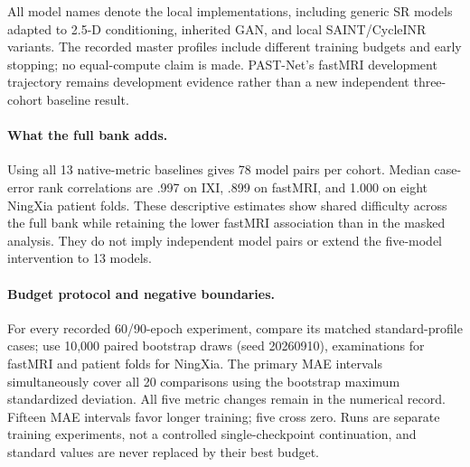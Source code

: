 All model names denote the local implementations, including generic SR models adapted to 2.5-D conditioning, inherited GAN, and local SAINT/CycleINR variants. The recorded master profiles include different training budgets and early stopping; no equal-compute claim is made. PAST-Net's fastMRI development trajectory remains development evidence rather than a new independent three-cohort baseline result.

\paragraph{What the full bank adds.}
Using all 13 native-metric baselines gives 78 model pairs per cohort. Median case-error rank correlations are .997 on IXI, .899 on fastMRI, and 1.000 on eight NingXia patient folds. These descriptive estimates show shared difficulty across the full bank while retaining the lower fastMRI association than in the masked analysis. They do not imply independent model pairs or extend the five-model intervention to 13 models.

\paragraph{Budget protocol and negative boundaries.}
For every recorded 60/90-epoch experiment, compare its matched standard-profile cases; use 10,000 paired bootstrap draws (seed 20260910), examinations for fastMRI and patient folds for NingXia. The primary MAE intervals simultaneously cover all 20 comparisons using the bootstrap maximum standardized deviation. All five metric changes remain in the numerical record. Fifteen MAE intervals favor longer training; five cross zero. Runs are separate training experiments, not a controlled single-checkpoint continuation, and standard values are never replaced by their best budget.

